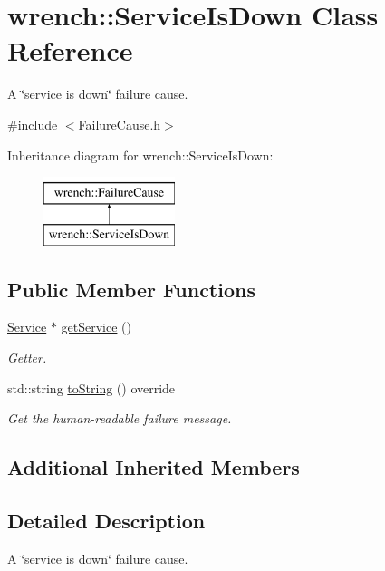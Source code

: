 \hypertarget{classwrench_1_1_service_is_down}{}\section{wrench\+:\+:Service\+Is\+Down Class Reference}
\label{classwrench_1_1_service_is_down}


A \char`\"{}service is down\char`\"{} failure cause.  




{\ttfamily \#include $<$Failure\+Cause.\+h$>$}

Inheritance diagram for wrench\+:\+:Service\+Is\+Down\+:\begin{figure}[H]
\begin{center}
\leavevmode
\includegraphics[height=2.000000cm]{classwrench_1_1_service_is_down}
\end{center}
\end{figure}
\subsection*{Public Member Functions}
\begin{DoxyCompactItemize}
\item 
\hyperlink{classwrench_1_1_service}{Service} $\ast$ \hyperlink{classwrench_1_1_service_is_down_a1e92883f2634958f1af834d791097c90}{get\+Service} ()
\begin{DoxyCompactList}\small\item\em Getter. \end{DoxyCompactList}\item 
std\+::string \hyperlink{classwrench_1_1_service_is_down_a29dbb2d3dd1b5d6a47536bab974b7151}{to\+String} () override
\begin{DoxyCompactList}\small\item\em Get the human-\/readable failure message. \end{DoxyCompactList}\end{DoxyCompactItemize}
\subsection*{Additional Inherited Members}


\subsection{Detailed Description}
A \char`\"{}service is down\char`\"{} failure cause. 

